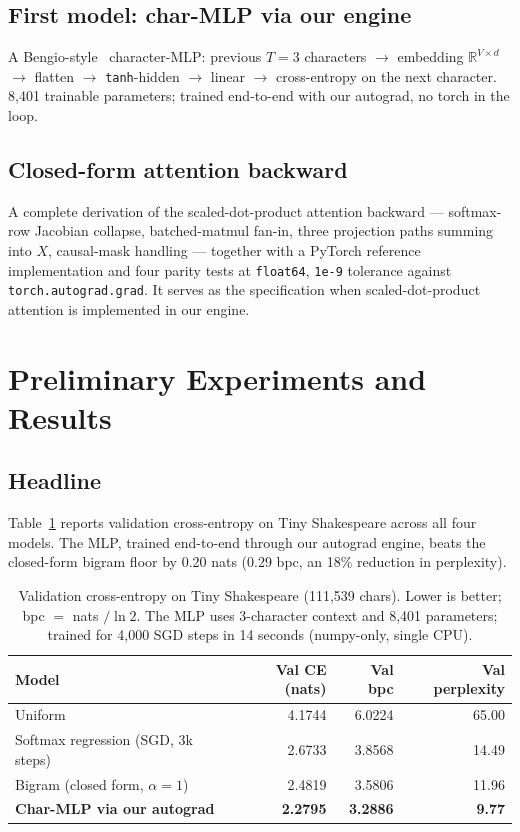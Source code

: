 \documentclass{article}
\begin{document}
\subsection{First model: char-MLP via our engine} A Bengio-style~\cite{bengio2003neural} character-MLP: previous $T\!=\!3$ characters $\to$ embedding $\mathbb{R}^{V\times d}$ $\to$ flatten $\to$ \texttt{tanh}-hidden $\to$ linear $\to$ cross-entropy on the next character. 8{,}401 trainable parameters; trained end-to-end with our autograd, no torch in the loop.

\subsection{Closed-form attention backward} A complete derivation of the scaled-dot-product attention backward — softmax-row Jacobian collapse, batched-matmul fan-in, three projection paths summing into $X$, causal-mask handling — together with a PyTorch reference implementation and four parity tests at \texttt{float64}, \texttt{1e-9} tolerance against \texttt{torch.autograd.grad}. It serves as the specification when scaled-dot-product attention is implemented in our engine.

\section{Preliminary Experiments and Results}

\subsection{Headline} Table~\ref{tab:results} reports validation cross-entropy on Tiny Shakespeare across all four models. The MLP, trained end-to-end through our autograd engine, beats the closed-form bigram floor by 0.20 nats (0.29 bpc, an 18\% reduction in perplexity).

\begin{table}[ht]
\centering
\small
\begin{tabular}{lrrr}
\toprule
Model & Val CE (nats) & Val bpc & Val perplexity \\
\midrule
Uniform & 4.1744 & 6.0224 & 65.00 \\
Softmax regression (SGD, 3k steps) & 2.6733 & 3.8568 & 14.49 \\
Bigram (closed form, $\alpha=1$) & 2.4819 & 3.5806 & 11.96 \\
\textbf{Char-MLP via our autograd} & \textbf{2.2795} & \textbf{3.2886} & \textbf{9.77} \\
\bottomrule
\end{tabular}
\caption{Validation cross-entropy on Tiny Shakespeare (111{,}539 chars). Lower is better; bpc $=$ nats $/\ln 2$. The MLP uses 3-character context and 8{,}401 parameters; trained for 4{,}000 SGD steps in 14 seconds (numpy-only, single CPU).}
\label{tab:results}
\end{table}
\end{document}
